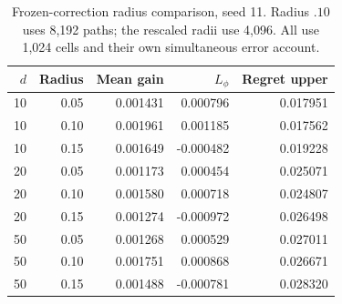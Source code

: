 \begin{table}[htbp]\centering\small\setlength{\tabcolsep}{4pt}
\caption{Frozen-correction radius comparison, seed 11. Radius $.10$ uses 8,192 paths; the rescaled radii use 4,096. All use 1,024 cells and their own simultaneous error account.}\label{tab:r11radius}
\begin{tabular}{rrrrr}\toprule
$d$ & Radius & Mean gain & $L_\phi$ & Regret upper\\\midrule
10 & 0.05 & 0.001431 & 0.000796 & 0.017951 \\
10 & 0.10 & 0.001961 & 0.001185 & 0.017562 \\
10 & 0.15 & 0.001649 & -0.000482 & 0.019228 \\
20 & 0.05 & 0.001173 & 0.000454 & 0.025071 \\
20 & 0.10 & 0.001580 & 0.000718 & 0.024807 \\
20 & 0.15 & 0.001274 & -0.000972 & 0.026498 \\
50 & 0.05 & 0.001268 & 0.000529 & 0.027011 \\
50 & 0.10 & 0.001751 & 0.000868 & 0.026671 \\
50 & 0.15 & 0.001488 & -0.000781 & 0.028320 \\
\bottomrule\end{tabular}\end{table}
